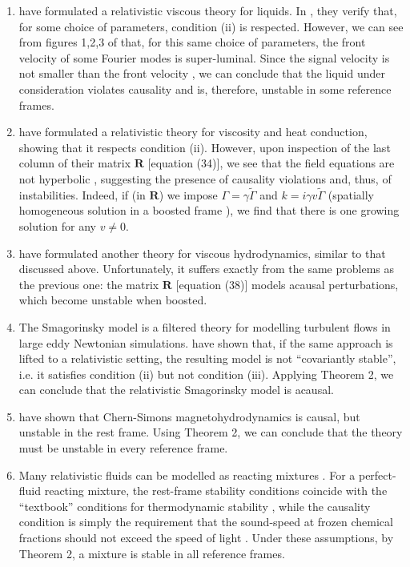\documentclass[a4paper, amsfonts, amssymb, amsmath, reprint, showkeys,  twoside, onecolumn,notitlepage,nofootinbib]{revtex4-1}
\theoremstyle{definition}
\theoremstyle{theorem}
\begin{document}
\begin{enumerate}
\item \citet{SrickerOttinger2019} have formulated a relativistic viscous theory for liquids. In \cite{SrickerOttinger2019}, they verify that, for some choice of parameters, condition (ii) is respected. However, we can see from figures 1,2,3 of \cite{SrickerOttinger2019} that, for this same choice of parameters, the front velocity of some Fourier modes is super-luminal. Since the signal velocity is not smaller than the front velocity \cite{Krotscheck1978}, we can conclude that the liquid under consideration violates causality and is, therefore, unstable in some reference frames.
\item \citet{VanStableFirst2012} have formulated a relativistic theory for viscosity and heat conduction, showing that it respects condition (ii). However, upon inspection of the last column of their matrix $\textbf{R}$ [equation (34)], we see that the field equations are not hyperbolic \cite{Hishcock1983}, suggesting the presence of causality violations and, thus, of instabilities. Indeed, if (in $\textbf{R}$) we impose $\Gamma=\gamma \tilde{\Gamma}$ and $k=i\gamma v \tilde{\Gamma}$ (spatially homogeneous solution in a boosted frame \cite{Hiscock_Insatibility_first_order}), we find that there is one growing solution for any $v \neq 0$.
\item  \citet{VanBiro2014} have formulated another theory for viscous hydrodynamics, similar to that discussed above. Unfortunately, it suffers exactly from the same problems as the previous one: the matrix $\textbf{R}$ [equation (38)] models acausal perturbations, which become unstable when boosted.
\item The Smagorinsky model \cite{Smagornki1963} is a filtered theory for modelling turbulent flows in large eddy Newtonian simulations.
\citet{Celora2021} have shown that, if the same approach is lifted to a relativistic setting, the resulting model is not  ``covariantly stable'', i.e. it satisfies condition (ii) but not condition (iii). Applying Theorem 2, we can conclude that the relativistic Smagorinsky model is acausal.
\item  \citet{Kiamari2021} have shown that Chern-Simons magnetohydrodynamics is causal, but unstable in the rest frame. Using Theorem 2, we can conclude that the theory must be unstable in every reference frame.
\item Many relativistic fluids can be modelled as reacting mixtures \cite{Burrows1986,BulkGavassino,Alford2020}. For a perfect-fluid reacting mixture, the rest-frame stability conditions coincide with the ``textbook'' conditions for thermodynamic stability \cite{GavassinoGibbs2021}, while the causality condition is simply the requirement that the sound-speed at frozen chemical fractions should not exceed the speed of light \cite{CamelioBulk1_2022}. Under these assumptions, by Theorem 2, a mixture is stable in all reference frames.

\end{enumerate}
\end{document}
